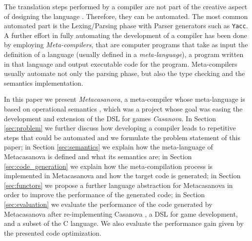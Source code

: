 The translation steps performed by a compiler are not part of the creative aspect of designing the language \cite{book1970cwic, czarnecki2000generative}. Therefore, they can be automated. The most common automated part is the Lexing/Parsing phase with Parser generators such as \texttt{Yacc}. A further effort in fully automating the development of a compiler has been done by employing \textit{Meta-compilers}, that are computer programs that take as input the definition of a language (usually defined in a \textit{meta-language}), a program written in that language and output executable code for the program. Meta-compilers usually automate not only the parsing phase, but also the type checking and the semantics implementation.
 
In this paper we present \textit{Metacasanova}, a meta-compiler whose meta-language is based on operational semantics \cite{plotkin1981, kahn1987natural}, which was a project whose goal was easing the development and extension of the DSL for games \textit{Casanova}. In Section \ref{sec:problem} we further discuss how developing a compiler leads to repetitive steps that could be automated and we formulate the problem statement of this paper; in Section \ref{sec:semantics} we explain how the meta-language of Metacasanova is defined and what its semantics are; in Section \ref{sec:code_generation} we explain how the meta-compilation process is implemented in Metacasanova and how the target code is generated; in Section \ref{sec:functors} we propose a further language abstraction for Metacasanova in order to improve the performance of the generated code; in Section \ref{sec:evaluation} we evaluate the performance of the code generated by Metacasanova after re-implementing Casanova \cite{abbadi2015casanova}, a DSL for game development, and a subset of the C language. We also evaluate the performance gain given by the presented code optimization.

